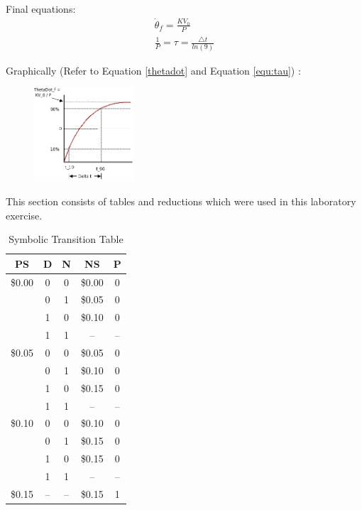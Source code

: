 \documentclass[aps,letterpaper,10pt]{revtex4}
\begin{document}
Final equations:
	\begin{align}
		\label{thetadot}\dot{\theta}_{f} = \frac{KV_{0}}{P} \\
		\label{equ:tau}\frac{1}{P} = \tau = \frac{\triangle t}{ln(9)}
	\end{align}

Graphically (Refer to Equation \ref{thetadot} and Equation \ref{equ:tau}) :
	\begin{figure}[h]
		\begin{center}
			\includegraphics[width=0.33\textwidth]{graph.png}
		\end{center}
	\label{graph}
	\end{figure}

\newpage %
This section consists of tables and reductions which were used in this laboratory exercise.

	\begin{table}[htbp]
	\begin{center}
		\begin{tabular}{|ccc|cc|}
			\hline
			\textbf{PS} & \textbf{D} & \textbf{N} & \textbf{NS} & \textbf{P} \\ \hline
			\$0.00 & 0 & 0 & \$0.00 & 0 \\
			 & 0 & 1 & \$0.05 & 0 \\
			 & 1 & 0 & \$0.10 & 0 \\
			 & 1 & 1 & -- & -- \\ \hline
			\$0.05 & 0 & 0 & \$0.05 & 0 \\
			 & 0 & 1 & \$0.10 & 0 \\
			 & 1 & 0 & \$0.15 & 0 \\
			 & 1 & 1 & -- & -- \\ \hline
			\$0.10 & 0 & 0 & \$0.10 & 0 \\
			 & 0 & 1 & \$0.15 & 0 \\
			 & 1 & 0 & \$0.15 & 0 \\
			 & 1 & 1 & -- & -- \\ \hline
			\$0.15 & -- & -- & \$0.15 & 1 \\ \hline
			\end{tabular}
	\end{center}
	\caption{Symbolic Transition Table}
	\label{symbolic}
	\end{table}
\end{document}
